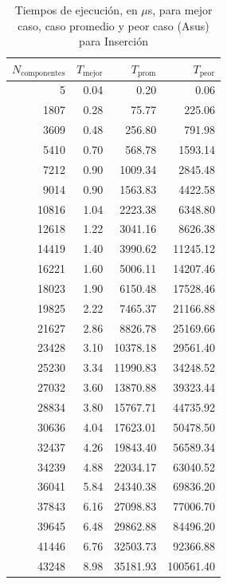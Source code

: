 \documentclass{homework}
\begin{document}
    \begin{table}[H] 
        \footnotesize
        \centering
        \begin{tabular}{|r|r|r|r|}
                \hline
                $N_{\text{componentes}}$ & $T_{\text{mejor}}$ & $T_{\text{prom}}$ & $T_{\text{peor}}$ \\
                \hline
                5 & 0.04 & 0.20 & 0.06 \\ 
                1807 & 0.28 & 75.77 & 225.06 \\ 
                3609 & 0.48 & 256.80 & 791.98 \\ 
                5410 & 0.70 & 568.78 & 1593.14 \\ 
                7212 & 0.90 & 1009.34 & 2845.48 \\ 
                9014 & 0.90 & 1563.83 & 4422.58 \\ 
                10816 & 1.04 & 2223.38 & 6348.80 \\ 
                12618 & 1.22 & 3041.16 & 8626.38 \\ 
                14419 & 1.40 & 3990.62 & 11245.12 \\ 
                16221 & 1.60 & 5006.11 & 14207.46 \\ 
                18023 & 1.90 & 6150.48 & 17528.46 \\ 
                19825 & 2.22 & 7465.37 & 21166.88 \\ 
                21627 & 2.86 & 8826.78 & 25169.66 \\ 
                23428 & 3.10 & 10378.18 & 29561.40 \\ 
                25230 & 3.34 & 11990.83 & 34248.52 \\ 
                27032 & 3.60 & 13870.88 & 39323.44 \\ 
                28834 & 3.80 & 15767.71 & 44735.92 \\ 
                30636 & 4.04 & 17623.01 & 50478.50 \\ 
                32437 & 4.26 & 19843.40 & 56589.34 \\ 
                34239 & 4.88 & 22034.17 & 63040.52 \\ 
                36041 & 5.84 & 24340.38 & 69836.20 \\ 
                37843 & 6.16 & 27098.83 & 77006.70 \\ 
                39645 & 6.48 & 29862.88 & 84496.20 \\ 
                41446 & 6.76 & 32503.73 & 92366.88 \\ 
                43248 & 8.98 & 35181.93 & 100561.40 \\ 
                \hline
        \end{tabular}
        \caption{Tiempos de ejecución, en $\mu$s, para mejor caso, caso promedio y peor caso (Asus) para Inserción}
    \end{table}
\end{document}
